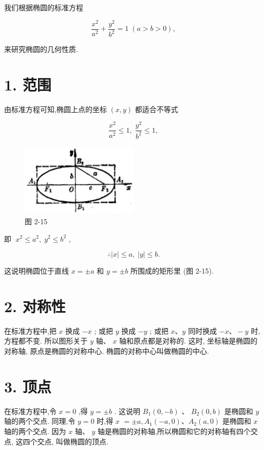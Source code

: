 \documentclass[lang=cn,newtx,10pt,scheme=chinese]{elegantbook}
\begin{document}
我们根据椭圆的标准方程

\[
  \frac{{x}^{2}}{{a}^{2}} + \frac{{y}^{2}}{{b}^{2}} = 1\;\left( {a > b > 0}\right) ,
\]

来研究椭圆的几何性质.

\section*{1. 范围}

由标准方程可知,椭圆上点的坐标 \(\left( {x,y}\right)\) 都适合不等式

\[
  \frac{{x}^{2}}{{a}^{2}} \leq 1,\;\frac{{y}^{2}}{{b}^{2}} \leq 1,
\]

\begin{figure}[h]
  \centering
  \includegraphics[max width=0.5\textwidth]{images/01912cc2-ffb6-728e-9ae7-b113ff05c64b_90_426128.jpg}
  \caption{图 2-15}
\end{figure}



即 \(\;{x}^{2} \leq {a}^{2},\;{y}^{2} \leq {b}^{2}\) ,

\[
  \therefore \left| x\right| \leq a,\;\left| y\right| \leq b\text{.}
\]

这说明椭圆位于直线 \(x = \pm a\) 和 \(y = \pm b\) 所围成的矩形里 (图 2-15).

\section*{2. 对称性}

在标准方程中,把 \(x\) 换成 \(- x\) ; 或把 \(y\) 换成 \(- y\) ; 或把 \(x\text{、}y\) 同时换成 \(- x\text{、} - y\) 时,方程都不变. 所以图形关于 \(y\) 轴、 \(x\) 轴和原点都是对称的. 这时, 坐标轴是椭圆的对称轴, 原点是椭圆的对称中心. 椭圆的对称中心叫做椭圆的中心.

\section*{3. 顶点}

在标准方程中,令 \(x = 0\) ,得 \(y = \pm b\) . 这说明 \({B}_{1}\left( {0, - b}\right)\) 、 \({B}_{2}\left( {0,b}\right)\) 是椭圆和 \(y\) 轴的两个交点. 同理,令 \(y = 0\) 时,得 \(x\) \(= \pm a,{A}_{1}\left( {-a,0}\right) \text{、}{A}_{2}\left( {a,0}\right)\) 是椭圆和 \(x\) 轴的两个交点. 因为 \(x\) 轴、 \(y\) 轴是椭圆的对称轴,所以椭圆和它的对称轴有四个交点, 这四个交点, 叫做椭圆的顶点.
\end{document}
